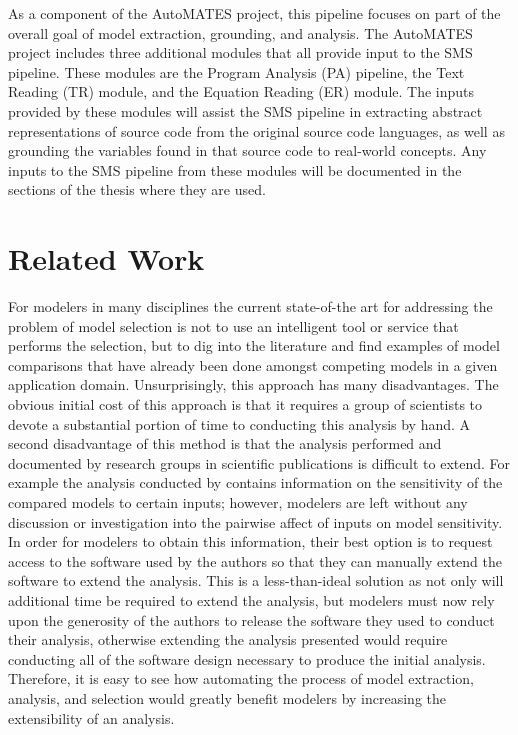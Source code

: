 As a component of the AutoMATES project, this pipeline focuses on part of the overall goal of model extraction, grounding, and analysis.
The AutoMATES project includes three additional modules that all provide input to the SMS pipeline.
These modules are the Program Analysis (PA) pipeline, the Text Reading (TR) module, and the Equation Reading (ER) module.
The inputs provided by these modules will assist the SMS pipeline in extracting abstract representations of source code from the original source code languages, as well as grounding the variables found in that source code to real-world concepts.
Any inputs to the SMS pipeline from these modules will be documented in the sections of the thesis where they are used.

\section{Related Work\label{sec:prior_work}}
For modelers in many disciplines the current state-of-the art for addressing the problem of model selection is not to use an intelligent tool or service that performs the selection, but to dig into the literature and find examples of model comparisons that have already been done amongst competing models in a given application domain.
Unsurprisingly, this approach has many disadvantages.
The obvious initial cost of this approach is that it requires a group of scientists to devote a substantial portion of time to conducting this analysis by hand.
A second disadvantage of this method is that the analysis performed and documented by research groups in scientific publications is difficult to extend.
For example the analysis conducted by \citet{camargo2016six} contains information on the sensitivity of the compared models to certain inputs; however, modelers are left without any discussion or investigation into the pairwise affect of inputs on model sensitivity.
In order for modelers to obtain this information, their best option is to request access to the software used by the authors so that they can manually extend the software to extend the analysis.
This is a less-than-ideal solution as not only will additional time be required to extend the analysis, but modelers must now rely upon the generosity of the authors to release the software they used to conduct their analysis, otherwise extending the analysis presented would require conducting all of the software design necessary to produce the initial analysis.
Therefore, it is easy to see how automating the process of model extraction, analysis, and selection would greatly benefit modelers by increasing the extensibility of an analysis.

